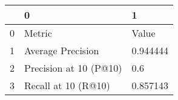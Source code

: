 \begin{tabular}{lll}
\toprule
{} &                       0 &         1 \\
\midrule
0 &                  Metric &     Value \\
1 &       Average Precision &  0.944444 \\
2 &  Precision at 10 (P@10) &       0.6 \\
3 &     Recall at 10 (R@10) &  0.857143 \\
\bottomrule
\end{tabular}
